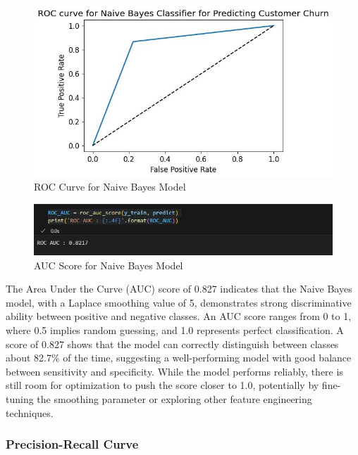 \begin{figure}[hbt!]
    \centering
    \includegraphics[width=1\linewidth]{Images/6.5c.jpg}
    \caption{ROC Curve for Naive Bayes Model}
    \label{fig:enter-label}
\end{figure}

\begin{figure}[hbt!]
    \centering
    \includegraphics[width=1\linewidth]{Images/6.5d.jpg}
    \caption{AUC Score for Naive Bayes Model}
    \label{fig:enter-label}
\end{figure}

The Area Under the Curve (AUC) score of 0.827 indicates that the Naive Bayes model, with a Laplace smoothing value of 5, demonstrates strong discriminative ability between positive and negative classes. An AUC score ranges from 0 to 1, where 0.5 implies random guessing, and 1.0 represents perfect classification. A score of 0.827 shows that the model can correctly distinguish between classes about 82.7\% of the time, suggesting a well-performing model with good balance between sensitivity and specificity. While the model performs reliably, there is still room for optimization to push the score closer to 1.0, potentially by fine-tuning the smoothing parameter or exploring other feature engineering techniques.

\subsubsection{Precision-Recall Curve}

